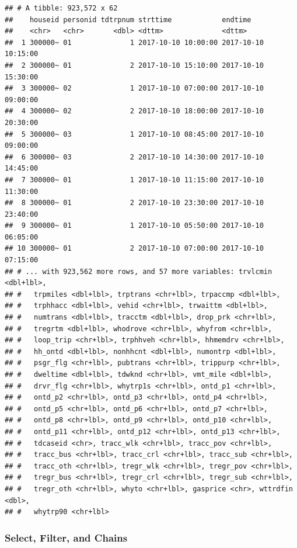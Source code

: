\documentclass[
]{book}
\begin{document}
\begin{verbatim}
## # A tibble: 923,572 x 62
##    houseid personid tdtrpnum strttime            endtime            
##    <chr>   <chr>       <dbl> <dttm>              <dttm>             
##  1 300000~ 01              1 2017-10-10 10:00:00 2017-10-10 10:15:00
##  2 300000~ 01              2 2017-10-10 15:10:00 2017-10-10 15:30:00
##  3 300000~ 02              1 2017-10-10 07:00:00 2017-10-10 09:00:00
##  4 300000~ 02              2 2017-10-10 18:00:00 2017-10-10 20:30:00
##  5 300000~ 03              1 2017-10-10 08:45:00 2017-10-10 09:00:00
##  6 300000~ 03              2 2017-10-10 14:30:00 2017-10-10 14:45:00
##  7 300000~ 01              1 2017-10-10 11:15:00 2017-10-10 11:30:00
##  8 300000~ 01              2 2017-10-10 23:30:00 2017-10-10 23:40:00
##  9 300000~ 01              1 2017-10-10 05:50:00 2017-10-10 06:05:00
## 10 300000~ 01              2 2017-10-10 07:00:00 2017-10-10 07:15:00
## # ... with 923,562 more rows, and 57 more variables: trvlcmin <dbl+lbl>,
## #   trpmiles <dbl+lbl>, trptrans <chr+lbl>, trpaccmp <dbl+lbl>,
## #   trphhacc <dbl+lbl>, vehid <chr+lbl>, trwaittm <dbl+lbl>,
## #   numtrans <dbl+lbl>, tracctm <dbl+lbl>, drop_prk <chr+lbl>,
## #   tregrtm <dbl+lbl>, whodrove <chr+lbl>, whyfrom <chr+lbl>,
## #   loop_trip <chr+lbl>, trphhveh <chr+lbl>, hhmemdrv <chr+lbl>,
## #   hh_ontd <dbl+lbl>, nonhhcnt <dbl+lbl>, numontrp <dbl+lbl>,
## #   psgr_flg <chr+lbl>, pubtrans <chr+lbl>, trippurp <chr+lbl>,
## #   dweltime <dbl+lbl>, tdwknd <chr+lbl>, vmt_mile <dbl+lbl>,
## #   drvr_flg <chr+lbl>, whytrp1s <chr+lbl>, ontd_p1 <chr+lbl>,
## #   ontd_p2 <chr+lbl>, ontd_p3 <chr+lbl>, ontd_p4 <chr+lbl>,
## #   ontd_p5 <chr+lbl>, ontd_p6 <chr+lbl>, ontd_p7 <chr+lbl>,
## #   ontd_p8 <chr+lbl>, ontd_p9 <chr+lbl>, ontd_p10 <chr+lbl>,
## #   ontd_p11 <chr+lbl>, ontd_p12 <chr+lbl>, ontd_p13 <chr+lbl>,
## #   tdcaseid <chr>, tracc_wlk <chr+lbl>, tracc_pov <chr+lbl>,
## #   tracc_bus <chr+lbl>, tracc_crl <chr+lbl>, tracc_sub <chr+lbl>,
## #   tracc_oth <chr+lbl>, tregr_wlk <chr+lbl>, tregr_pov <chr+lbl>,
## #   tregr_bus <chr+lbl>, tregr_crl <chr+lbl>, tregr_sub <chr+lbl>,
## #   tregr_oth <chr+lbl>, whyto <chr+lbl>, gasprice <chr>, wttrdfin <dbl>,
## #   whytrp90 <chr+lbl>
\end{verbatim}

\hypertarget{select-filter-and-chains}{%
\subsubsection{Select, Filter, and Chains}\label{select-filter-and-chains}}
\end{document}
